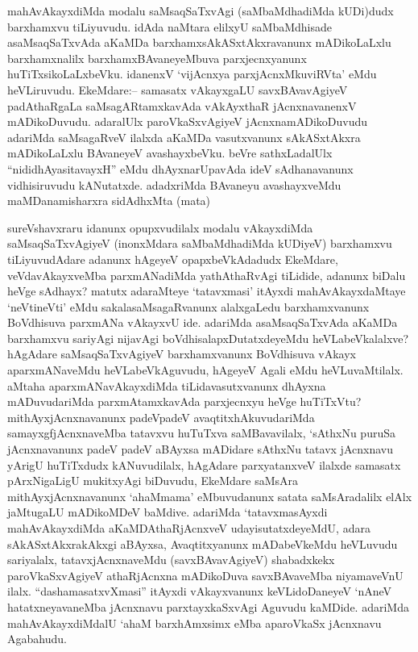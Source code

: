 
\begin{artha}
mahAvAkayxdiMda modalu saMsaqSaTxvAgi (saMbaMdhadiMda kUDi)dudx barxhamxvu tiLiyuvudu. idAda naMtara elilxyU saMbaMdhisade asaMsaqSaTxvAda aKaMDa barxhamxsAkASxtAkxravanunx mADikoLaLxlu barxhamxnalilx barxhamxBAvaneyeMbuva parxjecnxyanunx huTiTxsikoLaLxbeVku. idanenxV `vijAcnxya parxjAcnxMkuviRVta' eMdu heVLiruvudu. EkeMdare:{\rm --} samasatx vAkayxgaLU savxBAvavAgiyeV padAthaRgaLa saMsagARtamxkavAda vAkAyxthaR jAcnxnavanenxV mADikoDuvudu. adaralUlx paroVkaSxvAgiyeV jAcnxnamADikoDuvudu adariMda saMsagaRveV ilalxda aKaMDa vasutxvanunx sAkASxtAkxra mADikoLaLxlu BAvaneyeV avashayxbeVku. beVre sathxLadalUlx ``nididhAyasitavayxH'' eMdu dhAyxnarUpavAda ideV sAdhanavanunx vidhisiruvudu kANutatxde. adadxriMda BAvaneyu avashayxveMdu maMDanamisharxra sidAdhxMta (mata)
\end{artha}


\begin{artha}
sureVshavxraru idanunx opupxvudilalx modalu vAkayxdiMda saMsaqSaTxvAgiyeV (inonxMdara saMbaMdhadiMda kUDiyeV) barxhamxvu tiLiyuvudAdare adanunx hAgeyeV opapxbeVkAdadudx EkeMdare, veVdavAkayxveMba parxmANadiMda yathAthaRvAgi tiLidide, adanunx biDalu heVge sAdhayx? matutx adaraMteye `tatavxmasi' itAyxdi mahAvAkayxdaMtaye `neVtineVti' eMdu sakalasaMsagaRvanunx alalxgaLedu barxhamxvanunx BoVdhisuva parxmANa vAkayxvU ide. adariMda asaMsaqSaTxvAda aKaMDa barxhamxvu sariyAgi nijavAgi boVdhisalapxDutatxdeyeMdu heVLabeVkalalxve? hAgAdare saMsaqSaTxvAgiyeV barxhamxvanunx BoVdhisuva vAkayx aparxmANaveMdu heVLabeVkAguvudu, hAgeyeV Agali eMdu heVLuvaMtilalx. aMtaha aparxmANavAkayxdiMda tiLidavasutxvanunx dhAyxna mADuvudariMda parxmAtamxkavAda parxjecnxyu heVge huTiTxVtu? mithAyxjAcnxnavanunx padeVpadeV avaqtitxhAkuvudariMda samayxgfjAcnxnaveMba tatavxvu huTuTxva saMBavavilalx, `sAthxNu puruSa jAcnxnavanunx padeV padeV aBAyxsa mADidare sAthxNu tatavx jAcnxnavu yArigU huTiTxdudx kANuvudilalx, hAgAdare parxyatanxveV ilalxde samasatx pArxNigaLigU mukitxyAgi biDuvudu, EkeMdare saMsAra mithAyxjAcnxnavanunx `ahaMmama' eMbuvudanunx satata saMsAradalilx elAlx jaMtugaLU mADikoMDeV baMdive. adariMda `tatavxmasAyxdi mahAvAkayxdiMda aKaMDAthaRjAcnxveV udayisutatxdeyeMdU, adara sAkASxtAkxrakAkxgi aBAyxsa, Avaqtitxyanunx mADabeVkeMdu heVLuvudu sariyalalx, tatavxjAcnxnaveMdu (savxBAvavAgiyeV) shabadxkekx paroVkaSxvAgiyeV athaRjAcnxna mADikoDuva savxBAvaveMba niyamaveVnU ilalx. ``dashamasatxvXmasi'' itAyxdi vAkayxvanunx keVLidoDaneyeV `nAneV hatatxneyavaneMba jAcnxnavu parxtayxkaSxvAgi Aguvudu kaMDide. adariMda mahAvAkayxdiMdalU `ahaM barxhAmxsimx eMba aparoVkaSx jAcnxnavu Agabahudu. 
\end{artha}

